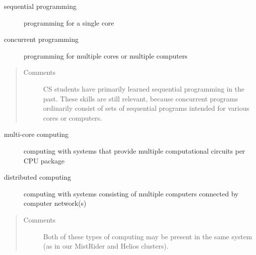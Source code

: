 \documentclass[letterpaper,10pt,openany,oneside]{sphinxmanual}
\begin{document}
\begin{description}
\item[{sequential programming}] \leavevmode{}\label{Introduction/Introduction:term-sequential-programming}
programming for a single core

\end{description}
\begin{description}
\item[{concurrent programming}] \leavevmode{}\label{Introduction/Introduction:term-concurrent-programming}
programming for multiple cores or multiple computers

\end{description}
\begin{quote}\begin{description}
\item[{Comments}] \leavevmode
CS students have primarily learned sequential programming in the past. These skills are still relevant, because concurrent programs ordinarily consist of sets of sequential programs intended for various cores or computers.

\end{description}\end{quote}
\begin{description}
\item[{multi-core computing}] \leavevmode{}\label{Introduction/Introduction:term-multi-core-computing}
computing with systems that provide multiple computational circuits per CPU package

\end{description}
\begin{description}
\item[{distributed computing}] \leavevmode{}\label{Introduction/Introduction:term-distributed-computing}
computing with systems consisting of multiple computers connected by computer network(s)

\end{description}
\begin{quote}\begin{description}
\item[{Comments}] \leavevmode
Both of these types of computing may be present in the same system (as in our MistRider and Helios clusters).

\end{description}\end{quote}
\end{document}
